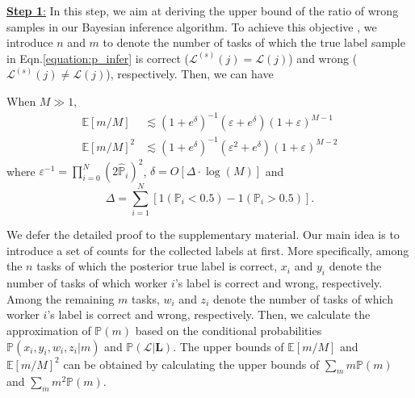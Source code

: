 \underline{\textbf{Step 1}:} In this step, we aim at deriving the upper bound of the ratio of wrong samples in our Bayesian inference algorithm.
To achieve this objective , we introduce $n$ and $m$ to denote the number of tasks of which the true label sample in Eqn.\ref{equation:p_infer} is correct ($\mathcal{L}^{(s)}(j)=\mathcal{L}(j)$) and wrong ($\mathcal{L}^{(s)}(j)\neq \mathcal{L}(j)$), respectively.
Then, we can have
\begin{lemma}
\label{ConvBound}
When $M\gg 1$,
\begin{align}
\mathbb{E}[m/M]&\lesssim (1+e^{\delta})^{-1}(\varepsilon+e^{\delta})(1+\varepsilon)^{M-1}\label{equation:CB1}\\
\mathbb{E}[m/M]^2&\lesssim (1+e^{\delta})^{-1}(\varepsilon^2+e^{\delta})(1+\varepsilon)^{M-2}\label{equation:CB2}
\end{align}
where $\varepsilon^{-1}=\prod_{i=0}^{N}(2\hat{\mathbb{P}}_i)^{2}$, $\delta=O[\Delta\cdot \log(M)]$ and 
$$\Delta={\sum}_{i=1}^N[1(\mathbb{P}_i<0.5)-1(\mathbb{P}_i>0.5)].$$
\end{lemma}
We defer the detailed proof to the supplementary material. Our main idea is to introduce a set of counts for the collected labels at first.
More specifically, among the $n$ tasks of which the posterior true label is correct, $x_i$ and $y_i$ denote the number of tasks of which worker $i$'s label is correct and wrong, respectively.
Among the remaining $m$ tasks, $w_i$ and $z_i$ denote the number of tasks of which worker $i$'s label is correct and wrong, respectively.
Then, we calculate the approximation of $\mathbb{P}(m)$ based on the conditional probabilities $\mathbb{P}(x_i,y_i,w_i, z_i|m)$ and $\mathbb{P}(\mathcal{L}|\bm{L})$.
The upper bounds of $\mathbb{E}[m/M]$ and $\mathbb{E}[m/M]^2$ can be obtained by calculating the upper bounds of $\sum_{m}m \mathbb{P}(m)$ and $\sum_{m} m^2 \mathbb{P}(m)$.

